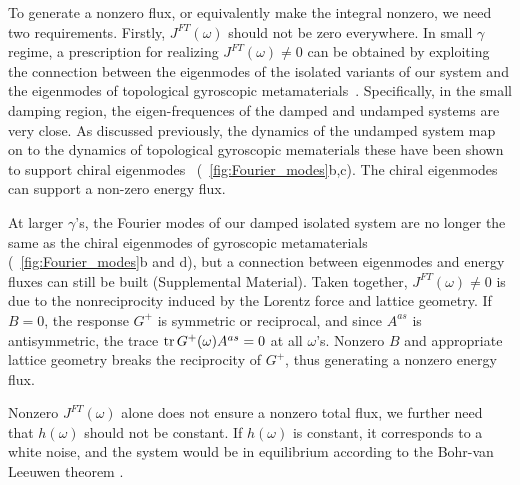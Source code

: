 \documentclass[
 preprint,
 preprintnumbers,
 amsmath,amssymb,
 aps,
 pre,
 longbibliography,
 superscriptaddress,
 10pt, twocolumn
]{revtex4-1}
\begin{document}
To generate a nonzero flux, or equivalently make the integral nonzero, we need two requirements.
Firstly, $J^{FT}(\omega)$ should not be zero everywhere.
In small $\gamma$ regime, a prescription for realizing $J^{FT}(\omega) \neq 0$ can be obtained by exploiting the connection between the eigenmodes of the isolated variants of our system and the eigenmodes of topological gyroscopic metamaterials~\cite{Nash2015TopologicalMechanics}. Specifically, in the small damping region, the eigen-frequences of the damped and undamped systems are very close. As discussed previously, the dynamics of the undamped system map on to the dynamics of topological gyroscopic mematerials \textendash these have been shown to support chiral eigenmodes~\cite{Nash2015TopologicalMechanics} (\figurename~\ref{fig:Fourier_modes}b,c). The chiral eigenmodes can support a non-zero energy flux.  


At larger $\gamma$'s, the Fourier modes of our damped isolated system are no longer the same as the chiral eigenmodes of gyroscopic metamaterials (\figurename~\ref{fig:Fourier_modes}b and d), but a connection between eigenmodes and energy fluxes can still be built (Supplemental Material).
Taken together, $J^{FT}(\omega) \neq 0$ is due to the nonreciprocity induced by the Lorentz force and lattice geometry. If $B=0$, the response $G^+$ is symmetric or reciprocal, and since $A^{as}$ is antisymmetric, the trace $\tr G^+(\omega) A^{as}=0$ at all $\omega$'s. Nonzero $B$ and appropriate lattice geometry breaks the reciprocity of $G^+$, thus generating a nonzero energy flux. 

Nonzero $J^{FT}(\omega)$ alone does not ensure a nonzero total flux, we further need that $h(\omega)$ should not be constant.
If $h(\omega)$ is constant, it corresponds to a white noise, and the system would be in equilibrium according to the Bohr-van Leeuwen theorem \cite{Pradhan2010NonexistenceClassical}. %
\end{document}
